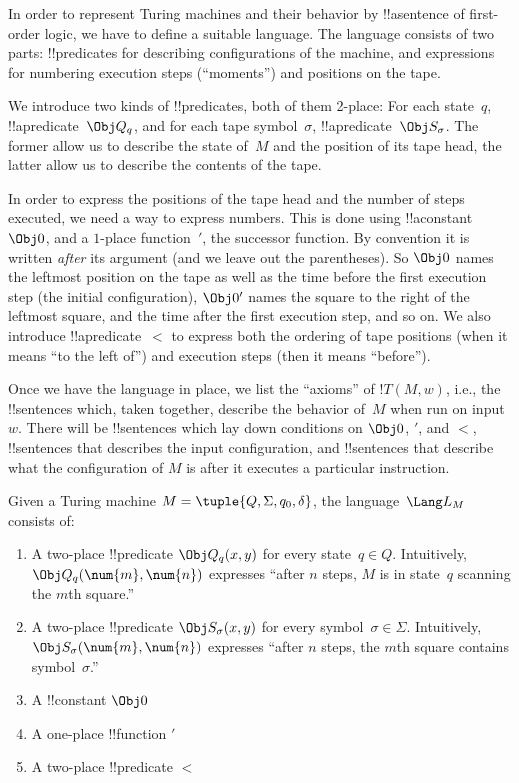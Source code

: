 \documentclass[../../../include/open-logic-section]{subfiles}
\begin{document}

\begin{explain}
In order to represent Turing machines and their behavior by !!a{sentence}
of first-order logic, we have to define a suitable language. The
language consists of two parts: !!{predicate}s for describing
configurations of the machine, and expressions for numbering execution
steps (``moments'') and positions on the tape.

We introduce two kinds of !!{predicate}s, both of them 2-place: For
each state~$q$, !!a{predicate}~$\Obj Q_q$, and for each tape
symbol~$\sigma$, !!a{predicate}~$\Obj S_\sigma$. The former allow us
to describe the state of~$M$ and the position of its tape head, the
latter allow us to describe the contents of the tape.  

In order to express the positions of the tape head and the number of
steps executed, we need a way to express numbers. This is done using
!!a{constant}~$\Obj 0$, and a $1$-place function~$\prime$, the
successor function. By convention it is written \emph{after} its
argument (and we leave out the parentheses). So $\Obj 0$ names the
leftmost position on the tape as well as the time before the first
execution step (the initial configuration), $\Obj 0'$ names the square
to the right of the leftmost square, and the time after the first
execution step, and so on. We also introduce !!a{predicate}~$<$ to
express both the ordering of tape positions (when it means ``to the
left of'') and execution steps (then it means ``before'').

Once we have the language in place, we list the ``axioms'' of $!T(M,
w)$, i.e., the !!{sentence}s which, taken together, describe the
behavior of~$M$ when run on input~$w$.  There will be !!{sentence}s
which lay down conditions on $\Obj 0$, $\prime$, and $<$,
!!{sentence}s that describes the input configuration, and
!!{sentence}s that describe what the configuration of $M$ is after it
executes a particular instruction.
\end{explain}

\begin{defn}
Given a Turing machine $M = \tuple{Q, \Sigma, q_0, \delta}$, the
language~$\Lang L_M$ consists of:
\begin{enumerate}
\item A two-place !!{predicate} $\Obj Q_q(x, y)$ for every state~$q \in
  Q$.  Intuitively, $\Obj Q_q(\num{m}, \num{n})$ expresses ``after $n$
  steps, $M$ is in state~$q$ scanning the $m$th square.''
\item A two-place !!{predicate} $\Obj S_\sigma(x, y)$ for every
  symbol~$\sigma\in \Sigma$.  Intuitively, $\Obj S_\sigma(\num{m},
  \num{n})$ expresses ``after $n$ steps, the $m$th square contains
  symbol~$\sigma$.''
\item A !!{constant} $\Obj 0$
\item A one-place !!{function} $\prime$
\item A two-place !!{predicate} $<$
\end{enumerate}
\end{defn}
\end{document}
